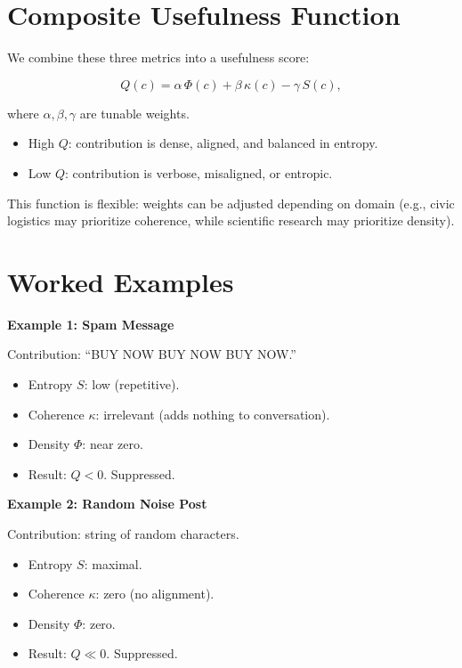 \documentclass[openany]{book}
\begin{document}
\section{Composite Usefulness Function}

We combine these three metrics into a usefulness score:

\[ Q(c) = \alpha \, \Phi(c) + \beta \, \kappa(c) - \gamma \, S(c), \]

where $\alpha, \beta, \gamma$ are tunable weights.

\begin{itemize}
    \item High $Q$: contribution is dense, aligned, and balanced in entropy.
    \item Low $Q$: contribution is verbose, misaligned, or entropic.
\end{itemize}

This function is flexible: weights can be adjusted depending on domain (e.g., civic logistics may prioritize coherence, while scientific research may prioritize density).

\section{Worked Examples}

\textbf{Example 1: Spam Message}

Contribution: ``BUY NOW BUY NOW BUY NOW.''

\begin{itemize}
    \item Entropy $S$: low (repetitive).
    \item Coherence $\kappa$: irrelevant (adds nothing to conversation).
    \item Density $\Phi$: near zero.
    \item Result: $Q < 0$. Suppressed.
\end{itemize}

\textbf{Example 2: Random Noise Post}

Contribution: string of random characters.

\begin{itemize}
    \item Entropy $S$: maximal.
    \item Coherence $\kappa$: zero (no alignment).
    \item Density $\Phi$: zero.
    \item Result: $Q \ll 0$. Suppressed.
\end{itemize}
\end{document}
